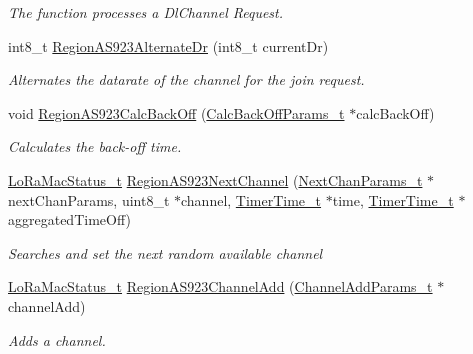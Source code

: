 \begin{DoxyCompactItemize}
\begin{DoxyCompactList}\small\item\em The function processes a Dl\+Channel Request. \end{DoxyCompactList}\item 
int8\+\_\+t \mbox{\hyperlink{group___r_e_g_i_o_n_a_s923_ga015999d2289b518bb0198915fcfbc822}{Region\+A\+S923\+Alternate\+Dr}} (int8\+\_\+t current\+Dr)
\begin{DoxyCompactList}\small\item\em Alternates the datarate of the channel for the join request. \end{DoxyCompactList}\item 
void \mbox{\hyperlink{group___r_e_g_i_o_n_a_s923_ga819573966df873dc3e76397d19cfcb34}{Region\+A\+S923\+Calc\+Back\+Off}} (\mbox{\hyperlink{group___r_e_g_i_o_n_ga7c5c9a8da174e6679eded8257dc92fd9}{Calc\+Back\+Off\+Params\+\_\+t}} $\ast$calc\+Back\+Off)
\begin{DoxyCompactList}\small\item\em Calculates the back-\/off time. \end{DoxyCompactList}\item 
\mbox{\hyperlink{group___l_o_r_a_m_a_c_ga30bd25657e10480f8605ee951b0ecfbd}{Lo\+Ra\+Mac\+Status\+\_\+t}} \mbox{\hyperlink{group___r_e_g_i_o_n_a_s923_gaa652d997f8e74e4beb3a13cf15bbd06d}{Region\+A\+S923\+Next\+Channel}} (\mbox{\hyperlink{group___r_e_g_i_o_n_ga115f5e83afae352c0a3dcdc193374040}{Next\+Chan\+Params\+\_\+t}} $\ast$next\+Chan\+Params, uint8\+\_\+t $\ast$channel, \mbox{\hyperlink{utilities_8h_a4215ca43d3e953099ea758ce428599d0}{Timer\+Time\+\_\+t}} $\ast$time, \mbox{\hyperlink{utilities_8h_a4215ca43d3e953099ea758ce428599d0}{Timer\+Time\+\_\+t}} $\ast$aggregated\+Time\+Off)
\begin{DoxyCompactList}\small\item\em Searches and set the next random available channel \end{DoxyCompactList}\item 
\mbox{\hyperlink{group___l_o_r_a_m_a_c_ga30bd25657e10480f8605ee951b0ecfbd}{Lo\+Ra\+Mac\+Status\+\_\+t}} \mbox{\hyperlink{group___r_e_g_i_o_n_a_s923_ga7477b7737c48e88f1d82a7ef70eb7b56}{Region\+A\+S923\+Channel\+Add}} (\mbox{\hyperlink{group___r_e_g_i_o_n_gab1c5f3aa06614283202906cef4417860}{Channel\+Add\+Params\+\_\+t}} $\ast$channel\+Add)
\begin{DoxyCompactList}\small\item\em Adds a channel. \end{DoxyCompactList}\item 

\end{DoxyCompactItemize}
